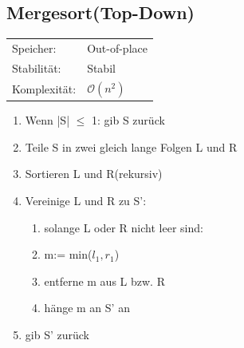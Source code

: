 \documentclass[12pt,a4paper]{article}
\begin{document}
\subsection{Mergesort(Top-Down)}
\begin{tabularx}{\textwidth}{l l}
	Speicher: &Out-of-place\\
	Stabilität: &Stabil\\
	Komplexität: &$\mathcal{O}(n^2)$\\
\end{tabularx}
\vspace{.8cm}
\newline
\begin{minipage}[c]{0.7\textwidth}
	\begin{enumerate}
		\item Wenn |S| $\leq $ 1: gib S zurück
		\item Teile S in zwei gleich lange Folgen L und R
		\item Sortieren L und R(rekursiv)
		\item Vereinige L und R zu S':
		\begin{enumerate}
			\item solange L oder R nicht leer sind:
			\item m:= min($l_1,r_1$)
			\item entferne m aus L bzw. R
			\item hänge m an S' an
		\end{enumerate}
		\item gib S' zurück
	\end{enumerate}
\end{minipage}
\end{document}
